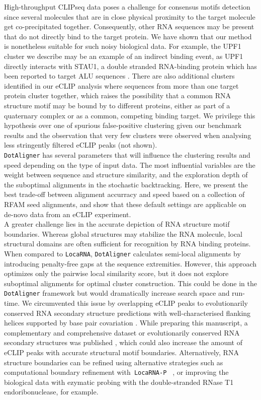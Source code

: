 \documentclass{bmcart}
\newcommand\dotaligner{\texttt{DotAligner}}
\newcommand\locarna{\texttt{LocaRNA}}
\begin{document}
High-throughput CLIPseq data poses a challenge for consensus motifs detection since
several molecules that are in close physical proximity to the target molecule get 
co-precipitated together. Consequently, other RNA sequences may be present 
that do not directly bind to the target protein. We have shown that our 
 method is nonetheless suitable for such noisy biological data. For example, 
 the UPF1 cluster we describe may be an example of an indirect binding event, 
 as UPF1 directly interacts with STAU1, a double stranded RNA-binding protein which has 
been reported to target ALU sequences \cite{gong2011lncrnas}. There are
also additional clusters identified in our eCLIP analysis where sequences from 
more than one target protein cluster together, which raises the possibility 
that a common RNA structure motif may be bound by to different proteins, either
as part of a quaternary complex or as a common, competing binding target. 
We privilege this hypothesis over one of spurious false-positive clustering 
given our benchmark results and the observation that very few clusters
were observed when analysing less stringently filtered eCLIP peaks (not shown). \\

\dotaligner{} has several parameters that will influence the clustering results and 
speed depending on the type of input data. The most influential variables are the weight between sequence and structure similarity, and the exploration depth of the suboptimal alignments in the stochastic
backtracking. Here, we present the best trade-off between alignment
accurracy and speed based on a collection of RFAM seed alignments, and show that these default settings are applicable on de-novo data from an eCLIP experiment. \\

A greater challenge lies in the accurate depiction of RNA structure motif boundaries. 
Whereas global structures may stabilize the RNA molecule, local
structural domains are often sufficient for recognition by RNA binding
proteins. When compared to \locarna{}, \dotaligner{} calculates semi-local
alignments by introducing penalty-free gaps at the sequence extremities. 
However, this approach optimizes only the pairwise local similarity score, but it does
not explore suboptimal alignments for optimal cluster construction. This could
be done in the \dotaligner{} framework but would dramatically increase search
space and run-time. We circumvented this issue by overlapping eCLIP peaks to 
evolutionarily conserved RNA secondary structure predictions with well-characterised
flanking helices supported by base pair covariation \cite{smith2013widespread}.
While preparing this manuscript, a complementary and comprehensive dataset 
or evolutionarily conserved RNA secondary structures was published \cite{seemann2017identification}, which 
could also increase the amount of eCLIP peaks with accurate structural motif boundaries. 
Alternatively, RNA structure boundaries can be refined 
using alternative strategies such as computational boundary refinement 
with\texttt{ LocaRNA-P } \cite{will2012locarna}, or improving the biological 
data with ezymatic probing with the double-stranded RNase T1 
endoribonuclease, for example. \\
\end{document}

